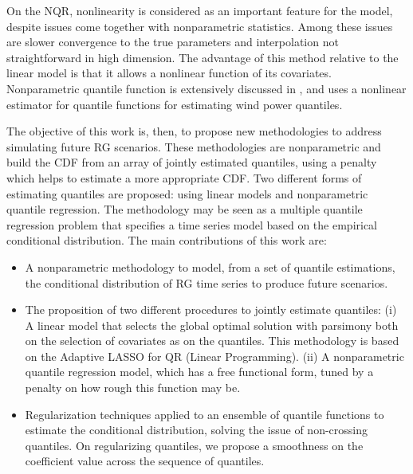 On the NQR, nonlinearity is considered as an important feature for the model, despite issues come together with nonparametric statistics. Among these issues are slower convergence to the true parameters and  interpolation not straightforward in high dimension. The advantage of this method relative to the linear model is that it allows a nonlinear function of its covariates.  Nonparametric quantile function is extensively discussed in \cite{takeuchi_nonparametric_2006}, and \cite{gallego2016line } uses a nonlinear estimator for quantile functions for estimating wind power quantiles. 






 
The objective of this work is, then, to propose new methodologies to address simulating future RG scenarios. These methodologies are nonparametric and build the CDF from an array of jointly estimated quantiles, using a penalty which helps to estimate a more appropriate CDF. Two different forms of estimating quantiles are proposed: using linear models and nonparametric quantile regression. The methodology may be seen as a multiple quantile regression problem that specifies a time series model based on the empirical conditional distribution. The main contributions of this work are:
\begin{itemize}
	\item A nonparametric methodology to model, from a set of quantile estimations, the conditional distribution of RG time series to produce future scenarios.
	
	\item The proposition of two different procedures to jointly estimate quantiles: (i) A linear model that selects the global optimal solution with parsimony both on the selection of covariates as on the quantiles. This methodology is based on the Adaptive LASSO for QR (Linear Programming). (ii) A nonparametric quantile regression model, which has a free functional form, tuned by a penalty on how rough this function may be. 
	
	\item Regularization techniques applied to an ensemble of quantile functions to estimate the conditional distribution, solving the issue of non-crossing quantiles. On regularizing quantiles, we propose a smoothness on the coefficient value across the sequence of quantiles.
	
\end{itemize}

